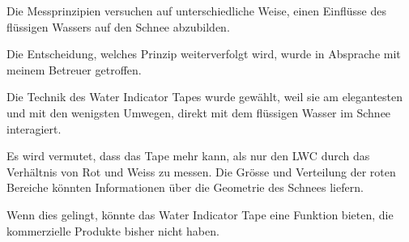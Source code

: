 Die Messprinzipien versuchen auf unterschiedliche Weise, einen Einflüsse des flüssigen Wassers auf den Schnee abzubilden.

Die Entscheidung, welches Prinzip weiterverfolgt wird, wurde in Absprache mit meinem Betreuer getroffen.

Die Technik des Water Indicator Tapes wurde gewählt, weil sie am elegantesten und mit den wenigsten Umwegen, direkt mit dem flüssigen Wasser im Schnee interagiert.




Es wird vermutet, dass das Tape mehr kann, als nur den LWC durch das Verhältnis von Rot und Weiss zu messen. Die Grösse und Verteilung der roten Bereiche könnten Informationen über die Geometrie des Schnees liefern.

Wenn dies gelingt, könnte das Water Indicator Tape eine Funktion bieten, die kommerzielle Produkte bisher nicht haben.
